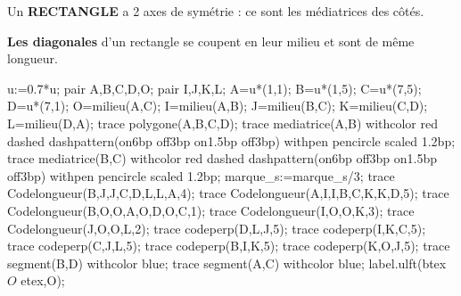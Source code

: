 \begin{minipage}{0.75\linewidth}
    \begin{propriete}[\admise]
        Un \textbf{RECTANGLE} a 2 axes de symétrie : ce sont les médiatrices des c\^{o}tés.
    \end{propriete}
    \begin{remarque}

        \textbf{Les diagonales} d'un rectangle se coupent en leur milieu et sont de même longueur.
    \end{remarque}
\end{minipage}
\begin{minipage}{0.2\linewidth}
    \begin{center}
        \begin{Geometrie}[CoinHD={(5.6u,4.2u)}]
            u:=0.7*u;
            pair A,B,C,D,O;
            pair I,J,K,L;
            A=u*(1,1);
            B=u*(1,5);
            C=u*(7,5);
            D=u*(7,1);
            O=milieu(A,C);
            I=milieu(A,B);
            J=milieu(B,C);
            K=milieu(C,D);
            L=milieu(D,A);
            trace polygone(A,B,C,D);
            trace mediatrice(A,B) withcolor red dashed dashpattern(on6bp off3bp on1.5bp off3bp) withpen pencircle scaled 1.2bp;
            trace mediatrice(B,C) withcolor red dashed dashpattern(on6bp off3bp on1.5bp off3bp) withpen pencircle scaled 1.2bp;
            marque_s:=marque_s/3;
            trace Codelongueur(B,J,J,C,D,L,L,A,4);
            trace Codelongueur(A,I,I,B,C,K,K,D,5);
            trace Codelongueur(B,O,O,A,O,D,O,C,1);
            trace Codelongueur(I,O,O,K,3);
            trace Codelongueur(J,O,O,L,2);
            trace codeperp(D,L,J,5);
            trace codeperp(I,K,C,5);
            trace codeperp(C,J,L,5);
            trace codeperp(B,I,K,5);
            trace codeperp(K,O,J,5);
            trace segment(B,D) withcolor blue;
            trace segment(A,C) withcolor blue;
            label.ulft(btex $O$ etex,O);
        \end{Geometrie}
    \end{center}
\end{minipage}

